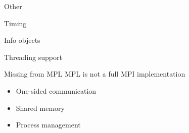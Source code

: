 \documentclass[10pt]{beamer}
\begin{document}
 {Other}

\begin{numberedframe}{Timing}
  
\end{numberedframe}

\begin{numberedframe}{Info objects}
  
\end{numberedframe}

\begin{numberedframe}{Threading support}
  
\end{numberedframe}

\begin{frame}{Missing from MPL}
  MPL is not a full MPI implementation
  \begin{itemize}
  \item One-sided communication
  \item Shared memory
  \item Process management
  \end{itemize}
\end{frame}
\end{document}
